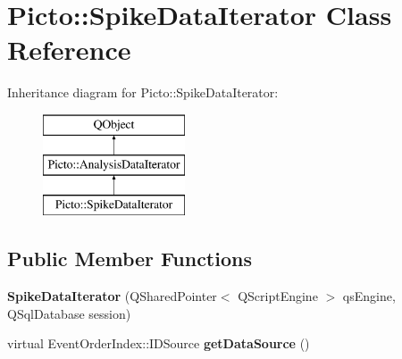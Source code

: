\hypertarget{class_picto_1_1_spike_data_iterator}{\section{Picto\-:\-:Spike\-Data\-Iterator Class Reference}
\label{class_picto_1_1_spike_data_iterator}
}
Inheritance diagram for Picto\-:\-:Spike\-Data\-Iterator\-:\begin{figure}[H]
\begin{center}
\leavevmode
\includegraphics[height=3.000000cm]{class_picto_1_1_spike_data_iterator}
\end{center}
\end{figure}
\subsection*{Public Member Functions}
\begin{DoxyCompactItemize}
\item 
\hypertarget{class_picto_1_1_spike_data_iterator_a398c27c9dd1ec8922b9e04f0a83e6a49}{{\bfseries Spike\-Data\-Iterator} (Q\-Shared\-Pointer$<$ Q\-Script\-Engine $>$ qs\-Engine, Q\-Sql\-Database session)}\label{class_picto_1_1_spike_data_iterator_a398c27c9dd1ec8922b9e04f0a83e6a49}

\item 
\hypertarget{class_picto_1_1_spike_data_iterator_a339217e7de955381793c15d2f13029e8}{virtual Event\-Order\-Index\-::\-I\-D\-Source {\bfseries get\-Data\-Source} ()}\label{class_picto_1_1_spike_data_iterator_a339217e7de955381793c15d2f13029e8}

\end{DoxyCompactItemize}
